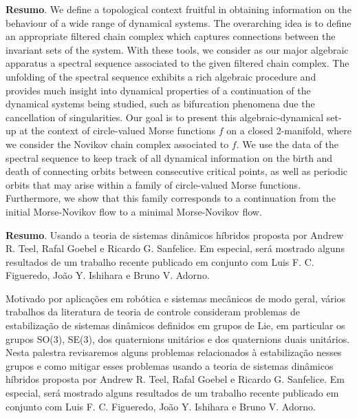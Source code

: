 	\noindent\textbf{Resumo}.\label{dvsl} 
	We define a topological context fruitful in obtaining information on
	the behaviour of a wide range of dynamical systems. The overarching idea is to define an appropriate filtered chain complex which captures connections between the invariant sets of the system.
	With these tools, we consider as our major algebraic apparatus a
	spectral sequence associated to the given filtered chain complex. The unfolding of the spectral sequence exhibits a rich algebraic procedure and provides much insight into dynamical properties of
	a continuation of the dynamical systems being studied, such as
	bifurcation phenomena due the cancellation of singularities. Our goal is to present this algebraic-dynamical set-up at the context
	of circle-valued Morse functions $f$ on a closed 2-manifold, where we consider the Novikov chain complex associated to $f$. We use the data of the spectral sequence to keep track of all dynamical information on the birth and death of connecting orbits between consecutive critical points, as well as periodic orbits that may arise within a family of circle-valued Morse functions. Furthermore, we show that this family corresponds to a continuation from the initial Morse-Novikov flow to a minimal Morse-Novikov flow.
	
	\vspace{24pt}	

	
	
	\noindent\textbf{Resumo}.\label{htmk} 
	Usando a teoria de sistemas dinâmicos híbridos proposta 
	por Andrew R. Teel, Rafal Goebel e Ricardo G. Sanfelice. Em especial, será mostrado alguns 
	resultados de um trabalho recente publicado em conjunto com Luis F. C. Figueredo, João Y. Ishihara
	e Bruno V. Adorno.  
	
	Motivado por aplicações em robótica e sistemas mecânicos de modo geral, vários trabalhos da literatura de teoria de controle consideram problemas de estabilização de 	sistemas dinâmicos definidos em grupos de Lie, em particular os grupos SO(3), SE(3), dos quaternions unitários e dos quaternions duais unitários.  Nesta palestra revisaremos alguns problemas relacionados à estabilização nesses grupos e como mitigar esses problemas usando a teoria de sistemas dinâmicos híbridos proposta por Andrew R. Teel, Rafal Goebel e Ricardo G. Sanfelice. Em especial, será mostrado alguns resultados de um trabalho recente publicado em conjunto com Luis F. C. Figueredo, João Y. Ishihara e Bruno V. Adorno.
	
